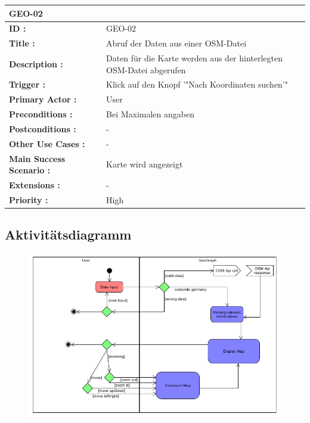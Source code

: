 	\begin{table}[H]
		\begin{tabular}{|p{8cm}|p{8cm}|}
			\hline
			\textbf{GEO-02 } \\ 
			\hline
			\textbf{ID :}\centering & GEO-02  \\ \hline 
			\textbf{Title :}\centering & Abruf der Daten aus einer OSM-Datei \\ \hline 
			\textbf{Description :}\centering & Daten für die Karte werden aus der hinterlegten OSM-Datei abgerufen \\ \hline 
			\textbf{Trigger :}\centering & Klick auf den Knopf '"Nach Koordinaten suchen'" \\ \hline 
			\textbf{Primary Actor :} \centering & User \\ \hline 
			\textbf{Preconditions :}\centering & Bei Maximalen angaben\\ \hline 
			\textbf{Postconditions :}\centering & - \\ \hline
			\textbf{Other Use Cases :}\centering & - \\ \hline  
			\textbf{Main Success Scenario :}\centering & Karte wird angezeigt \\ \hline  
			\textbf{Extensions :}\centering & - \\ \hline  
			\textbf{Priority :}\centering & High \\ \hline  
		\end{tabular}
	\end{table}
	\subsection{Aktivitätsdiagramm}
	\begin{figure}[H]
	\centering
	\includegraphics[width=0.7\linewidth]{images/Ablauf}
	\caption{}
	\label{fig:Akitiviti}
	\end{figure}
